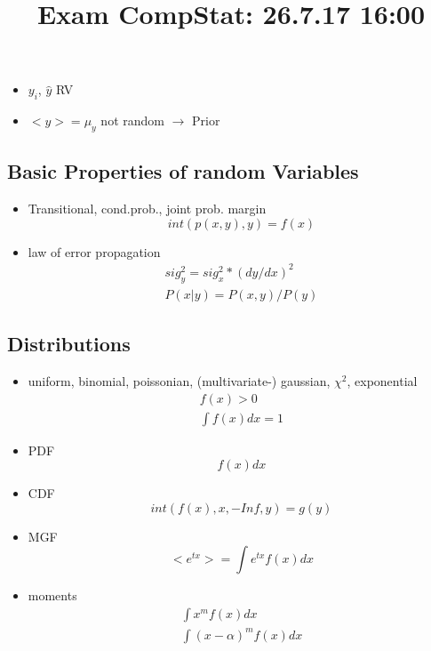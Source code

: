 \documentclass[]{scrartcl}
\title{Exam CompStat: 26.7.17 16:00}
\begin{document}
    \maketitle

    \begin{itemize}
      \item $y_i$, $\hat{y}$ RV
      \item $< y > = \mu_y$ not random $\rightarrow$ Prior
    \end{itemize}

    \subsection{Basic Properties of random Variables}

      \begin{itemize}
        \item Transitional, cond.prob., joint prob. margin
        \[
          int(p(x,y),y)=f(x)
        \]
        \item law of error propagation
        \begin{align*}
          sig^2_y = sig^2_x*(dy/dx)^2\\
          P(x|y) = P(x,y)/P(y)
        \end{align*}
      \end{itemize}

    \subsection{Distributions}\label{distributions}

    \begin{itemize}
    \item uniform, binomial, poissonian, (multivariate-) gaussian, $\chi^2$, exponential
      \begin{align*}
        f(x) > 0\\
        \int f(x) d x = 1
      \end{align*}
    \item PDF
      \[ f(x)dx\]
    \item CDF
      \[ int(f(x), x, -Inf, y) = g(y)\]
    \item MGF
      \[
        < e^{tx} > = \int e^{tx} f(x) dx
      \]
    \item moments
      \begin{align*}
        \int x^m f(x) dx\\
        \int (x-\alpha)^m f(x) dx
      \end{align*}
    \end{itemize}
\end{document}
